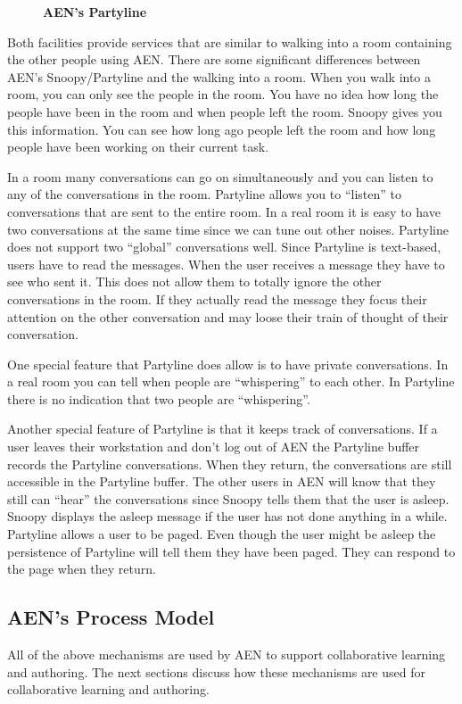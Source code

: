 \begin{figure}[htb]
  \centerline{}
  \caption{{\bf AEN's Partyline}}
  \label{fig:Partyline}
\end{figure}

Both facilities provide services that are similar to walking into
a room containing the other people using AEN.  There are some significant
differences between AEN's Snoopy/Partyline and the walking into a room.
When you walk into a room, you can only see the people in the room.  You
have no idea how long the people have been in the room and when people left
the room.  Snoopy gives you this information.  You can see how long ago
people left the room and how long people have been working on their current
task.

In a room many conversations can go on simultaneously and you can listen to
any of the conversations in the room.  Partyline allows you to ``listen''
to conversations that are sent to the entire room. In a real room it is
easy to have two conversations at the same time since we can tune out other
noises.  Partyline does not support two ``global'' conversations well.
Since Partyline is text-based, users have to read the messages.  When the
user receives a message they have to see who sent it.  This does not allow
them to totally ignore the other conversations in the room.  If they
actually read the message they focus their attention on the other
conversation and may loose their train of thought of their conversation.

One special feature that Partyline does allow is to have private
conversations.  In a real room you can tell when people are ``whispering''
to each other.  In Partyline there is no indication that two people are
``whispering''.

Another special feature of Partyline is that it keeps track of
conversations.  If a user leaves their workstation and don't log out of AEN
the Partyline buffer records the Partyline conversations.  When they return,
the conversations are still accessible in the Partyline buffer.  The other
users in AEN will know that they still can ``hear'' the conversations
since Snoopy tells them that the user is asleep.  Snoopy displays the
asleep message if the user has not done anything in a while.  Partyline
allows a user to be paged.  Even though the user might be asleep the
persistence of Partyline will tell them they have been paged.  They can
respond to the page when they return.

\subsection{AEN's Process Model}
All of the above mechanisms are used by AEN to support collaborative
learning and authoring.  The next sections discuss how these mechanisms
are used for collaborative learning and authoring.

